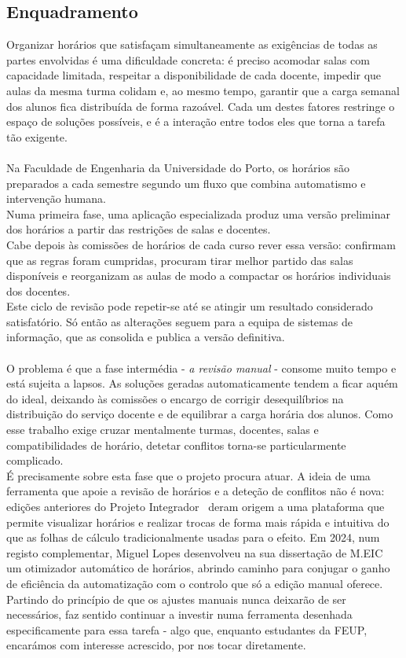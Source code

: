 \documentclass[10pt]{article}
\begin{document}
	\subsection{Enquadramento}

    Organizar horários que satisfaçam simultaneamente as exigências de todas as partes envolvidas é uma dificuldade concreta: é preciso acomodar salas com capacidade limitada, respeitar a disponibilidade de cada docente, impedir que aulas da mesma turma colidam e, ao mesmo tempo, garantir que a carga semanal dos alunos fica distribuída de forma razoável. Cada um destes fatores restringe o espaço de soluções possíveis, e é a interação entre todos eles que torna a tarefa tão exigente.\\
    \\
    Na Faculdade de Engenharia da Universidade do Porto, os horários são preparados a cada semestre segundo um fluxo que combina automatismo e intervenção humana.\\
    Numa primeira fase, uma aplicação especializada produz uma versão preliminar dos horários a partir das restrições de salas e docentes.\\
    Cabe depois às comissões de horários de cada curso rever essa versão: confirmam que as regras foram cumpridas, procuram tirar melhor partido das salas disponíveis e reorganizam as aulas de modo a compactar os horários individuais dos docentes.\\
    Este ciclo de revisão pode repetir-se até se atingir um resultado considerado satisfatório. Só então as alterações seguem para a equipa de sistemas de informação, que as consolida e publica a versão definitiva.\\
    \\
    O problema é que a fase intermédia - \emph{a revisão manual} - consome muito tempo e está sujeita a lapsos. As soluções geradas automaticamente tendem a ficar aquém do ideal, deixando às comissões o encargo de corrigir desequilíbrios na distribuição do serviço docente e de equilibrar a carga horária dos alunos. Como esse trabalho exige cruzar mentalmente turmas, docentes, salas e compatibilidades de horário, detetar conflitos torna-se particularmente complicado.
    \\
    É precisamente sobre esta fase que o projeto procura atuar. A ideia de uma ferramenta que apoie a revisão de horários e a deteção de conflitos não é nova: edições anteriores do Projeto Integrador~\cite{carvalho2023, correia2024, oliveira2025} deram origem a uma plataforma que permite visualizar horários e realizar trocas de forma mais rápida e intuitiva do que as folhas de cálculo tradicionalmente usadas para o efeito. Em 2024, num registo complementar, Miguel Lopes desenvolveu na sua dissertação de M.EIC~\cite{lopes2024} um otimizador automático de horários, abrindo caminho para conjugar o ganho de eficiência da automatização com o controlo que só a edição manual oferece. Partindo do princípio de que os ajustes manuais nunca deixarão de ser necessários, faz sentido continuar a investir numa ferramenta desenhada especificamente para essa tarefa - algo que, enquanto estudantes da FEUP, encarámos com interesse acrescido, por nos tocar diretamente.
\end{document}
